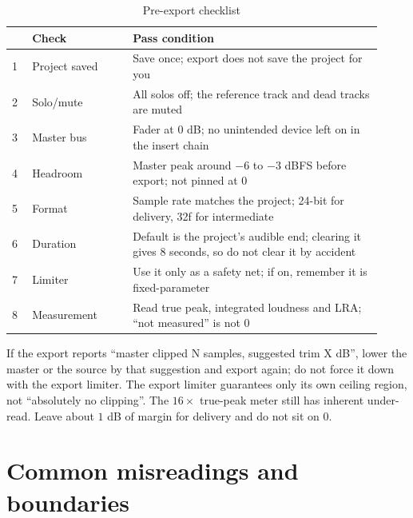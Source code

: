 \begin{table}[htbp]
\centering
\small
\begin{tabular}{@{}p{0.05\linewidth}p{0.25\linewidth}p{0.62\linewidth}@{}}
\hline
 & Check & Pass condition \\
\hline
1 & Project saved & Save once; export does not save the project for you \\
2 & Solo/mute & All solos off; the reference track and dead tracks are muted \\
3 & Master bus & Fader at $0$ dB; no unintended device left on in the insert chain \\
4 & Headroom & Master peak around $-6$ to $-3$ dBFS before export; not pinned at $0$ \\
5 & Format & Sample rate matches the project; 24-bit for delivery, 32f for intermediate \\
6 & Duration & Default is the project's audible end; clearing it gives 8 seconds, so do not clear it by accident \\
7 & Limiter & Use it only as a safety net; if on, remember it is fixed-parameter \\
8 & Measurement & Read true peak, integrated loudness and LRA; ``not measured'' is not 0 \\
\hline
\end{tabular}
\caption{Pre-export checklist}
\label{tab:walk-export-check}
\end{table}

If the export reports ``master clipped N samples, suggested trim X dB'', lower the master or the source by that suggestion and export again; do not force it down with the export limiter. The export limiter guarantees only its own ceiling region, not ``absolutely no clipping''. The $16\times$ true-peak meter still has inherent under-read. Leave about $1$ dB of margin for delivery and do not sit on $0$.

\section{Common misreadings and boundaries}

